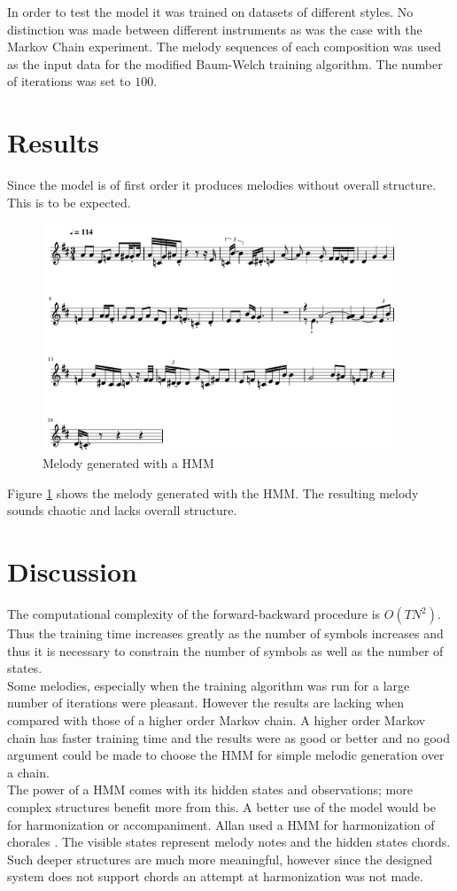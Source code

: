 In order to test the model it was trained on datasets of different styles. No distinction was made between different instruments as was the case with the Markov Chain experiment.
The melody sequences of each composition was used as the input data for the modified Baum-Welch training algorithm. The number of iterations was set to $100$.


\section{Results}
Since the model is of first order it produces melodies without overall structure. This is to be expected.

\begin{figure}[h!]
\centerline{\includegraphics[width=400px]{../images/hmm_melody_generated.pdf}}
\caption{Melody generated with a \ac{HMM}}
\label{ims:hmmmelody}
\end{figure}

Figure \ref{ims:hmmmelody} shows the melody generated with the \ac{HMM}. The resulting melody sounds chaotic and lacks overall structure.

\section{Discussion}
The computational complexity of the forward-backward procedure is $O(T N^2)$. Thus the training time increases greatly as the number of symbols increases and thus it is necessary to constrain the number of symbols as well as the number of states.
\\
Some melodies, especially when the training algorithm was run for a large number of iterations were pleasant. However the results are lacking when compared with those of a higher order Markov chain. A higher order Markov chain has faster training time and the results were as good or better and no good argument could be made to choose the \ac{HMM} for simple melodic generation over a chain.
\\
The power of a \ac{HMM} comes with its hidden states and observations; more complex structures benefit more from this. A better use of the model would be for harmonization or accompaniment. Allan used a \ac{HMM} for harmonization of chorales \cite{Allan2004}. The visible states represent melody notes and the hidden states chords. Such deeper structures are much more meaningful, however since the designed system does not support chords an attempt at harmonization was not made.

